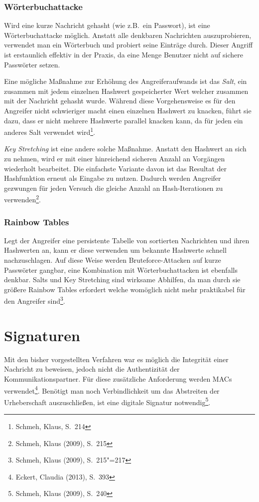\subsection{Wörterbuchattacke}

Wird eine kurze Nachricht gehasht (wie z.B.~ein Passwort), ist eine
Wörterbuchattacke möglich.  Anstatt alle denkbaren Nachrichten
auszuprobieren, verwendet man ein Wörterbuch und probiert seine
Einträge durch.  Dieser Angriff ist erstaunlich effektiv in der
Praxis, da eine Menge Benutzer nicht auf sichere Passwörter setzen.

Eine mögliche Maßnahme zur Erhöhung des Angreiferaufwands ist das
\emph{Salt}, ein zusammen mit jedem einzelnen Hashwert gespeicherter
Wert welcher zusammen mit der Nachricht gehasht wurde.  Während diese
Vorgehensweise es für den Angreifer nicht schwieriger macht einen
einzelnen Hashwert zu knacken, führt sie dazu, dass er nicht mehrere
Hashwerte parallel knacken kann, da für jeden ein anderes Salt
verwendet wird\footnote{Schmeh, Klaus, S.~214}.

\emph{Key Stretching} ist eine andere solche Maßnahme.  Anstatt den
Hashwert an sich zu nehmen, wird er mit einer hinreichend sicheren
Anzahl an Vorgängen wiederholt bearbeitet.  Die einfachste Variante
davon ist das Resultat der Hashfunktion erneut als Eingabe zu nutzen.
Dadurch werden Angreifer gezwungen für jeden Versuch die gleiche
Anzahl an Hash-Iterationen zu verwenden\footnote{Schmeh, Klaus (2009),
  S.~215}.

\subsection{Rainbow Tables}

Legt der Angreifer eine persistente Tabelle von sortierten Nachrichten
und ihren Hashwerten an, kann er diese verwenden um bekannte Hashwerte
schnell nachzuschlagen.  Auf diese Weise werden Bruteforce-Attacken
auf kurze Passwörter gangbar, eine Kombination mit Wörterbuchattacken
ist ebenfalls denkbar.  Salts und Key Stretching sind wirksame
Abhilfen, da man durch sie größere Rainbow Tables erfordert welche
womöglich nicht mehr praktikabel für den Angreifer
sind\footnote{Schmeh, Klaus (2009), S.~215"=217}.

\author{Autor: Vasilij Schneidermann}
\chapter{Signaturen}

Mit den bisher vorgestellten Verfahren war es möglich die Integrität
einer Nachricht zu beweisen, jedoch nicht die Authentizität der
Kommunikationspartner.  Für diese zusätzliche Anforderung werden
\ac{MAC}s verwendet\footnote{Eckert, Claudia (2013), S.~393}.
Benötigt man noch Verbindlichkeit um das Abstreiten der Urheberschaft
auszuschließen, ist eine digitale Signatur notwendig\footnote{Schmeh,
  Klaus (2009), S.~240}.

